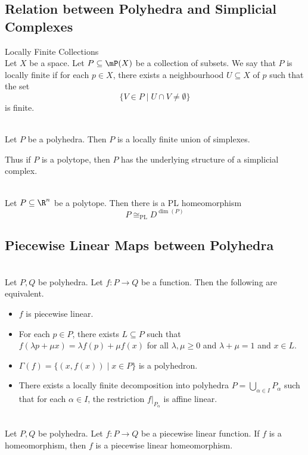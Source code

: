 \documentclass[a4paper]{article}
\begin{document}
\subsection{Relation between Polyhedra and Simplicial Complexes}
\begin{defn}{Locally Finite Collections}{}\\
Let $X$ be a space. Let $P\subseteq\mP(X)$ be a collection of subsets. We say that $P$ is locally finite if for each $p\in X$, there exists a neighbourhood $U\subseteq X$ of $p$ such that the set $$\{V\in P\;|\;U\cap V\neq\emptyset\}$$ is finite. 
\end{defn}

\begin{prp}{}{}\\
Let $P$ be a polyhedra. Then $P$ is a locally finite union of simplexes. 
\end{prp}

Thus if $P$ is a polytope, then $P$ has the underlying structure of a simplicial complex. 

\begin{prp}{}{}\\
Let $P\subseteq\R^n$ be a polytope. Then there is a PL homeomorphism $$P\cong_\text{PL}D^{\dim(P)}$$
\end{prp}

\subsection{Piecewise Linear Maps between Polyhedra}
\begin{prp}{}{}\\
Let $P,Q$ be polyhedra. Let $f:P\to Q$ be a function. Then the following are equivalent. 
\begin{itemize}
\item $f$ is piecewise linear. 
\item For each $p\in P$, there exists $L\subseteq P$ such that $f(\lambda p+\mu x)=\lambda f(p)+\mu f(x)$ for all $\lambda,\mu\geq 0$ and $\lambda+\mu=1$ and $x\in L$. 
\item $\Gamma(f)=\{(x,f(x))\;|\;x\in P\}$ is a polyhedron. 
\item There exists a locally finite decomposition into polyhedra $P=\bigcup_{\alpha\in I}P_\alpha$ such that for each $\alpha\in I$, the restriction $f|_{P_\alpha}$ is affine linear. 
\end{itemize}
\end{prp}

\begin{lmm}{}{}\\
Let $P,Q$ be polyhedra. Let $f:P\to Q$ be a piecewise linear function. If $f$ is a homeomorphism, then $f$ is a piecewise linear homeomorphism. 
\end{lmm}
\end{document}
